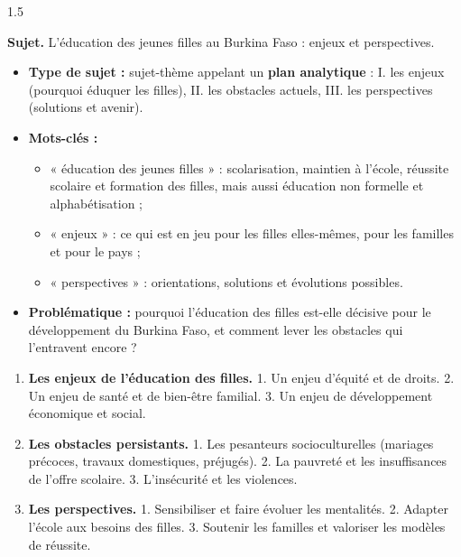 \documentclass[12pt]{article}
\begin{document}
\begin{spacing}{1.5}

\noindent\textbf{Sujet.} L'éducation des jeunes filles au Burkina Faso : enjeux et perspectives.


\begin{itemize}
\item \textbf{Type de sujet :} sujet-thème appelant un \textbf{plan analytique} : I. les enjeux (pourquoi éduquer les filles), II. les obstacles actuels, III. les perspectives (solutions et avenir).
\item \textbf{Mots-clés :}
  \begin{itemize}
  \item « éducation des jeunes filles » : scolarisation, maintien à l'école, réussite scolaire et formation des filles, mais aussi éducation non formelle et alphabétisation ;
  \item « enjeux » : ce qui est en jeu pour les filles elles-mêmes, pour les familles et pour le pays ;
  \item « perspectives » : orientations, solutions et évolutions possibles.
  \end{itemize}
\item \textbf{Problématique :} pourquoi l'éducation des filles est-elle décisive pour le développement du Burkina Faso, et comment lever les obstacles qui l'entravent encore ?
\end{itemize}


\begin{enumerate}
\item[I.] \textbf{Les enjeux de l'éducation des filles.} 1. Un enjeu d'équité et de droits. 2. Un enjeu de santé et de bien-être familial. 3. Un enjeu de développement économique et social.
\item[II.] \textbf{Les obstacles persistants.} 1. Les pesanteurs socioculturelles (mariages précoces, travaux domestiques, préjugés). 2. La pauvreté et les insuffisances de l'offre scolaire. 3. L'insécurité et les violences.
\item[III.] \textbf{Les perspectives.} 1. Sensibiliser et faire évoluer les mentalités. 2. Adapter l'école aux besoins des filles. 3. Soutenir les familles et valoriser les modèles de réussite.
\end{enumerate}


\end{spacing}
\end{document}
